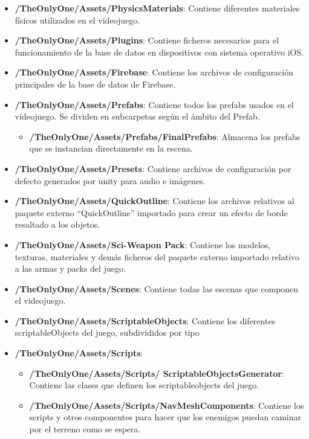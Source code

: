 \begin{itemize}
\begin{itemize}
\begin{itemize}
            \item \textbf{/TheOnlyOne/Assets/PhysicsMaterials}: Contiene diferentes materiales físicos utilizados en el videojuego.
            \item \textbf{/TheOnlyOne/Assets/Plugins}: Contiene ficheros necesarios para el funcionamiento de la base de datos en dispositivos con sistema operativo iOS.
            \item \textbf{/TheOnlyOne/Assets/Firebase}: Contiene los archivos de configuración principales de la base de datos de Firebase.
            \item \textbf{/TheOnlyOne/Assets/Prefabs}: Contiene todos los prefabs usados en el videojuego. Se dividen en subcarpetas según el ámbito del Prefab.
                \begin{itemize}
                \item \textbf{/TheOnlyOne/Assets/Prefabs/FinalPrefabs}: Almacena los prefabs que se instancian directamente en la escena.
                \end{itemize}
            \item \textbf{/TheOnlyOne/Assets/Presets}: Contiene archivos de configuración por defecto generados por unity para audio e imágenes.
            \item \textbf{/TheOnlyOne/Assets/QuickOutline}: Contiene los archivos relativos al paquete externo “QuickOutline” importado para crear un efecto de borde resaltado a los objetos.
            \item \textbf{/TheOnlyOne/Assets/Sci-Weapon Pack}: Contiene los modelos, texturas, materiales y demás ficheros del paquete externo importado relativo a las armas y packs del juego.
            \item \textbf{/TheOnlyOne/Assets/Scenes}: Contiene todas las escenas que componen el videojuego.
            \item \textbf{/TheOnlyOne/Assets/ScriptableObjects}: Contiene los diferentes scriptableObjects del juego, subdivididos por tipo
            \item \textbf{/TheOnlyOne/Assets/Scripts}: 
            \begin{itemize}
                \item \textbf{/TheOnlyOne/Assets/Scripts/	ScriptableObjectsGenerator}: Contiene las clases que definen los scriptableobjects del juego.
                \item \textbf{/TheOnlyOne/Assets/Scripts/NavMeshComponents}: Contiene los scripts y otros componentes para hacer que los enemigos puedan caminar por el terreno como se espera.

\end{itemize}
\end{itemize}
\end{itemize}
\end{itemize}
